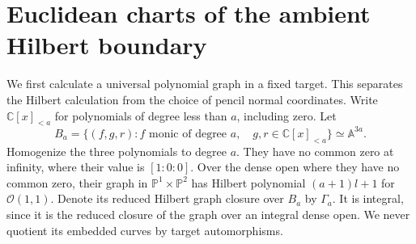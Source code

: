 \documentclass[11pt,reqno]{amsart}
\numberwithin{equation}{section}
\theoremstyle{definition}\newtheorem{definition}[theorem]{Definition}
\theoremstyle{remark}\newtheorem{remark}[theorem]{Remark}
\newcommand{\C}{\mathbb C}\newcommand{\Q}{\mathbb Q}
\newcommand{\Pj}{\mathbb P}\newcommand{\A}{\mathbb A}
\newcommand{\OO}{\mathcal O}\newcommand{\II}{\mathcal I}
\begin{document}
\section{Euclidean charts of the ambient Hilbert boundary}
\label{sec:Euclidean-boundary-v162}
We first calculate a universal polynomial graph in a fixed target.
This separates the Hilbert calculation from the choice of pencil
normal coordinates. Write $\C[x]_{<a}$ for polynomials of degree
less than $a$, including zero. Let
\[
 B_a=\{(f,g,r): f\text{ monic of degree }a,\quad
                          g,r\in\C[x]_{<a}\}\simeq\A^{3a}.
\]
Homogenize the three polynomials to degree $a$. They have no common
zero at infinity, where their value is $[1:0:0]$. Over the dense open
where they have no common zero, their graph in $\Pj^1\times\Pj^2$
has Hilbert polynomial $(a+1)l+1$ for $\OO(1,1)$. Denote its reduced
Hilbert graph closure over $B_a$ by $\Gamma_a$. It is integral,
since it is the reduced closure of the graph over an integral dense
open. We never quotient its embedded curves by target automorphisms.
\end{document}
